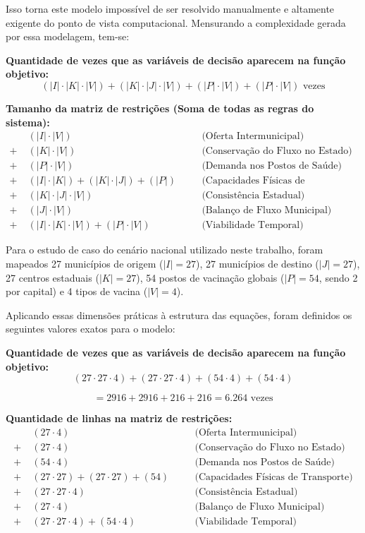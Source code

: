Isso torna este modelo impossível de ser resolvido manualmente e altamente exigente do ponto de vista computacional. Mensurando a complexidade gerada por essa modelagem, tem-se:

\textbf{Quantidade de vezes que as variáveis de decisão aparecem na função objetivo:}
\[
(|I| \cdot |K| \cdot |V|)
+
(|K| \cdot |J| \cdot |V|)
+
(|P| \cdot |V|)
+
(|P| \cdot |V|)
\text{ vezes}
\]

\textbf{Tamanho da matriz de restrições (Soma de todas as regras do sistema):}
\begin{align*}
& (|I| \cdot |V|) \quad && \text{(Oferta Intermunicipal)} \\
+ \;& (|K| \cdot |V|) \quad && \text{(Conservação do Fluxo no Estado)} \\
+ \;& (|P| \cdot |V|) \quad && \text{(Demanda nos Postos de Saúde)} \\
+ \;& (|I| \cdot |K|) + (|K| \cdot |J|) + (|P|) \quad && \text{(Capacidades Físicas de Transporte)} \\
+ \;& (|K| \cdot |J| \cdot |V|) \quad && \text{(Consistência Estadual)} \\
+ \;& (|J| \cdot |V|) \quad && \text{(Balanço de Fluxo Municipal)} \\
+ \;& (|I| \cdot |K| \cdot |V|) + (|P| \cdot |V|) \quad && \text{(Viabilidade Temporal)}
\end{align*}

Para o estudo de caso do cenário nacional utilizado neste trabalho, foram mapeados 27 municípios de origem ($|I|=27$), 27 municípios de destino ($|J|=27$), 27 centros estaduais ($|K|=27$), 54 postos de vacinação globais ($|P|=54$, sendo 2 por capital) e 4 tipos de vacina ($|V|=4$).

Aplicando essas dimensões práticas à estrutura das equações, foram definidos os seguintes valores exatos para o modelo:

\textbf{Quantidade de vezes que as variáveis de decisão aparecem na função objetivo:}
\[
(27 \cdot 27 \cdot 4) 
+ 
(27 \cdot 27 \cdot 4) 
+ 
(54 \cdot 4) 
+
(54 \cdot 4)
\]

\[
= 2916 + 2916 + 216 + 216 = 6.264 \text{ vezes}
\]

\textbf{Quantidade de linhas na matriz de restrições:}
\begin{align*}
& (27 \cdot 4) \quad && \text{(Oferta Intermunicipal)} \\
+ \;& (27 \cdot 4) \quad && \text{(Conservação do Fluxo no Estado)} \\
+ \;& (54 \cdot 4) \quad && \text{(Demanda nos Postos de Saúde)} \\
+ \;& (27 \cdot 27) + (27 \cdot 27) + (54) \quad && \text{(Capacidades Físicas de Transporte)} \\
+ \;& (27 \cdot 27 \cdot 4) \quad && \text{(Consistência Estadual)} \\
+ \;& (27 \cdot 4) \quad && \text{(Balanço de Fluxo Municipal)} \\
+ \;& (27 \cdot 27 \cdot 4) + (54 \cdot 4) \quad && \text{(Viabilidade Temporal)}
\end{align*}

